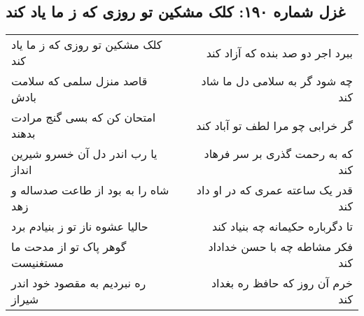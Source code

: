 \begin{center}
\section*{غزل شماره ۱۹۰: کلک مشکین تو روزی که ز ما یاد کند}
\label{sec:sh190}
\begin{longtable}{l p{0.5cm} r}
کلک مشکین تو روزی که ز ما یاد کند
&&
ببرد اجر دو صد بنده که آزاد کند
\\
قاصد منزل سلمی که سلامت بادش
&&
چه شود گر به سلامی دل ما شاد کند
\\
امتحان کن که بسی گنج مرادت بدهند
&&
گر خرابی چو مرا لطف تو آباد کند
\\
یا رب اندر دل آن خسرو شیرین انداز
&&
که به رحمت گذری بر سر فرهاد کند
\\
شاه را به بود از طاعت صدساله و زهد
&&
قدر یک ساعته عمری که در او داد کند
\\
حالیا عشوه ناز تو ز بنیادم برد
&&
تا دگرباره حکیمانه چه بنیاد کند
\\
گوهر پاک تو از مدحت ما مستغنیست
&&
فکر مشاطه چه با حسن خداداد کند
\\
ره نبردیم به مقصود خود اندر شیراز
&&
خرم آن روز که حافظ ره بغداد کند
\\
\end{longtable}
\end{center}
